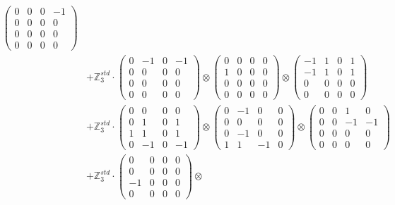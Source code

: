 \documentclass{article}
\begin{document}
{\begin{align}
            \begin{pmatrix} 0 & 0 & 0 & -1 \\ 0 & 0 & 0 & 0 \\ 0 & 0 & 0 & 0 \\ 0 & 0 & 0 & 0 \end{pmatrix} \\ 
        &+ \label{Rs16-Rc11-Solution-22-c25} \mathbb{Z}_3^{std} \cdot 
            \begin{pmatrix} 0 & -1 & 0 & -1 \\ 0 & 0 & 0 & 0 \\ 0 & 0 & 0 & 0 \\ 0 & 0 & 0 & 0 \end{pmatrix} \otimes 
            \begin{pmatrix} 0 & 0 & 0 & 0 \\ 1 & 0 & 0 & 0 \\ 0 & 0 & 0 & 0 \\ 0 & 0 & 0 & 0 \end{pmatrix} \otimes 
            \begin{pmatrix} -1 & 1 & 0 & 1 \\ -1 & 1 & 0 & 1 \\ 0 & 0 & 0 & 0 \\ 0 & 0 & 0 & 0 \end{pmatrix} \\ 
        &+ \label{Rs16-Rc11-Solution-22-c26} \mathbb{Z}_3^{std} \cdot 
            \begin{pmatrix} 0 & 0 & 0 & 0 \\ 0 & 1 & 0 & 1 \\ 1 & 1 & 0 & 1 \\ 0 & -1 & 0 & -1 \end{pmatrix} \otimes 
            \begin{pmatrix} 0 & -1 & 0 & 0 \\ 0 & 0 & 0 & 0 \\ 0 & -1 & 0 & 0 \\ 1 & 1 & -1 & 0 \end{pmatrix} \otimes 
            \begin{pmatrix} 0 & 0 & 1 & 0 \\ 0 & 0 & -1 & -1 \\ 0 & 0 & 0 & 0 \\ 0 & 0 & 0 & 0 \end{pmatrix} \\ 
        &+ \label{Rs16-Rc11-Solution-22-c27} \mathbb{Z}_3^{std} \cdot 
            \begin{pmatrix} 0 & 0 & 0 & 0 \\ 0 & 0 & 0 & 0 \\ -1 & 0 & 0 & 0 \\ 0 & 0 & 0 & 0 \end{pmatrix} \otimes 

\end{align}}
\end{document}
